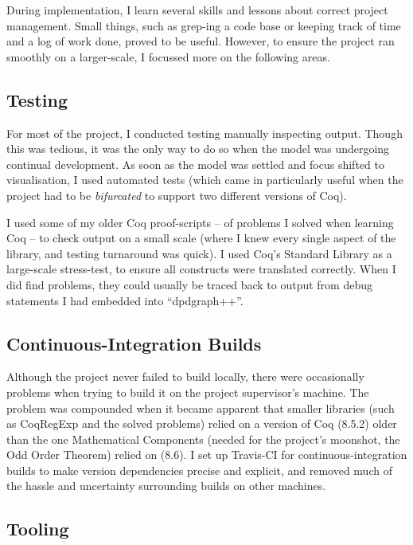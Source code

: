 During implementation, I learn several skills and lessons about correct project
management. Small things, such as grep-ing a code base or keeping track of time
and a log of work done, proved to be useful. However, to ensure the project ran
smoothly on a larger-scale, I focussed more on the following areas.

\subsection{Testing}

For most of the project, I conducted testing manually inspecting output. Though
this was tedious, it was the only way to do so when the model was undergoing
continual development. As soon as the model was settled and focus shifted to
visualisation, I used automated tests (which came in particularly useful when
the project had to be \emph{bifurcated} to support two different versions of
Coq).

I used some of my older Coq proof-scripts -- of problems I solved when learning
Coq -- to check output on a small scale (where I knew every single aspect of the
library, and testing turnaround was quick). I used Coq's Standard Library as a
large-scale stress-test, to ensure all constructs were translated correctly.
When I did find problems, they could usually be traced back to output from debug
statements I had embedded into ``dpdgraph++''.

\subsection{Continuous-Integration Builds}

Although the project never failed to build locally, there were occasionally
problems when trying to build it on the project supervisor's machine. The
problem was compounded when it became apparent that smaller libraries (such as
CoqRegExp and the solved problems) relied on a version of Coq (8.5.2) older than
the one Mathematical Components (needed for the project's moonshot, the Odd
Order Theorem) relied on (8.6). I set up Travis-CI for continuous-integration
builds to make version dependencies precise and explicit, and removed much of
the hassle and uncertainty surrounding builds on other machines.

\subsection{Tooling}

